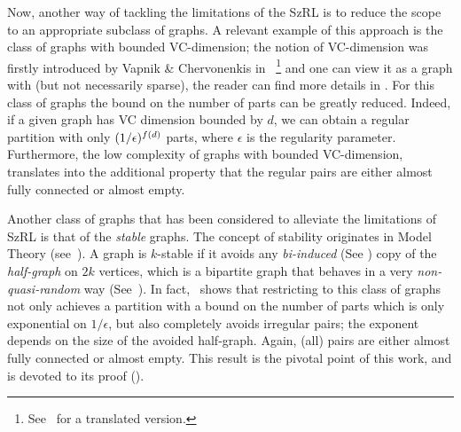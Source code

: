     Now, another way of tackling the limitations of the SzRL is to reduce the scope to an appropriate subclass of graphs.
    A relevant example of this approach is the class of graphs with bounded VC-dimension;
    the notion of VC-dimension was firstly introduced by Vapnik \& Chervonenkis
    in~\cite{the_uniform_convergence_of_frequencies_of_the_appearance_of_events_to_their_probabilities}
    \hspace{-3pt}\footnote{
        See~\cite{on_the_uniform_convergence_of_relative_frequencies_of_events_to_their_probabilities}
        for a translated version.}
    and one can view it as a graph with  (but not necessarily sparse), the reader can find more
    details in .
    For this class of graphs the bound on the number of parts can be greatly reduced.
    Indeed, if a given graph has VC dimension bounded by $d$, we can obtain a regular partition with only
    $( {1}/{\epsilon} )^{f(d)}$ parts, where $\epsilon$ is the regularity parameter.
    Furthermore, the low complexity of graphs with bounded VC-dimension, translates into the additional property that the
    regular pairs are either almost fully connected or almost empty.

    Another class of graphs that has been considered to alleviate the limitations of SzRL is that of the \emph{stable}
    graphs.
    The concept of stability originates in Model Theory
    (see~\cite{classification_theory_and_the_number_of_non_isomorphic_models}).
    A graph is $k$-stable if it avoids any \emph{bi-induced} (See ) copy of the \emph{half-graph}
    on $2k$ vertices, which is a bipartite graph that behaves in a very \emph{non-quasi-random} way (See~).
    In fact,~\cite[Theorem 5.19]{regularity_lemmas_for_stable_graphs} shows that restricting to this class of graphs not only achieves
    a partition with a bound on the number of parts which is only exponential on $1/\epsilon$, but also completely avoids
    irregular pairs; the exponent depends on the size of the avoided half-graph.
    Again, (all) pairs are either almost fully connected or almost empty.
    This result is the pivotal point of this work, and  is devoted to its proof
    ().

